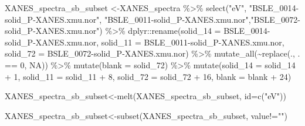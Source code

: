 \documentclass[
]{article}
\newenvironment{Shaded}{\begin{snugshade}}{\end{snugshade}}
\newcommand{\AttributeTok}[1]{\textcolor[rgb]{0.77,0.63,0.00}{#1}}
\newcommand{\ConstantTok}[1]{\textcolor[rgb]{0.00,0.00,0.00}{#1}}
\newcommand{\DecValTok}[1]{\textcolor[rgb]{0.00,0.00,0.81}{#1}}
\newcommand{\FunctionTok}[1]{\textcolor[rgb]{0.00,0.00,0.00}{#1}}
\newcommand{\NormalTok}[1]{#1}
\newcommand{\OtherTok}[1]{\textcolor[rgb]{0.56,0.35,0.01}{#1}}
\newcommand{\SpecialCharTok}[1]{\textcolor[rgb]{0.00,0.00,0.00}{#1}}
\newcommand{\StringTok}[1]{\textcolor[rgb]{0.31,0.60,0.02}{#1}}
\begin{document}
\begin{Shaded}
\begin{Highlighting}[]
\NormalTok{XANES\_spectra\_sb\_subset }\OtherTok{\textless{}{-}}\NormalTok{XANES\_spectra }\SpecialCharTok{\%\textgreater{}\%}
  \FunctionTok{select}\NormalTok{(}\StringTok{"eV"}\NormalTok{, }\StringTok{"BSLE\_0014{-}solid\_P{-}XANES.xmu.nor"}\NormalTok{, }\StringTok{"BSLE\_0011{-}solid\_P{-}XANES.xmu.nor"}\NormalTok{,}\StringTok{"BSLE\_0072{-}solid\_P{-}XANES.xmu.nor"}\NormalTok{) }\SpecialCharTok{\%\textgreater{}\%}
\NormalTok{  dplyr}\SpecialCharTok{::}\FunctionTok{rename}\NormalTok{(}\StringTok{\textquotesingle{}solid\_14\textquotesingle{}} \OtherTok{=} \StringTok{\textquotesingle{}BSLE\_0014{-}solid\_P{-}XANES.xmu.nor\textquotesingle{}}\NormalTok{,}
                \StringTok{\textquotesingle{}solid\_11\textquotesingle{}} \OtherTok{=} \StringTok{\textquotesingle{}BSLE\_0011{-}solid\_P{-}XANES.xmu.nor\textquotesingle{}}\NormalTok{,}
                \StringTok{\textquotesingle{}solid\_72\textquotesingle{}} \OtherTok{=} \StringTok{\textquotesingle{}BSLE\_0072{-}solid\_P{-}XANES.xmu.nor\textquotesingle{}}\NormalTok{) }\SpecialCharTok{\%\textgreater{}\%}
  \FunctionTok{mutate\_all}\NormalTok{(}\SpecialCharTok{\textasciitilde{}}\FunctionTok{replace}\NormalTok{(., . }\SpecialCharTok{==} \DecValTok{0}\NormalTok{, }\ConstantTok{NA}\NormalTok{)) }\SpecialCharTok{\%\textgreater{}\%}
  \FunctionTok{mutate}\NormalTok{(}\AttributeTok{blank =}\NormalTok{ solid\_72) }\SpecialCharTok{\%\textgreater{}\%}
  \FunctionTok{mutate}\NormalTok{(}\AttributeTok{solid\_14 =}\NormalTok{ solid\_14 }\SpecialCharTok{+} \DecValTok{1}\NormalTok{,}
         \AttributeTok{solid\_11 =}\NormalTok{ solid\_11 }\SpecialCharTok{+} \DecValTok{8}\NormalTok{,}
         \AttributeTok{solid\_72 =}\NormalTok{ solid\_72 }\SpecialCharTok{+} \DecValTok{16}\NormalTok{,}
         \AttributeTok{blank =}\NormalTok{ blank }\SpecialCharTok{+} \DecValTok{24}\NormalTok{) }
         
\NormalTok{XANES\_spectra\_sb\_subset}\OtherTok{\textless{}{-}}\FunctionTok{melt}\NormalTok{(XANES\_spectra\_sb\_subset, }\AttributeTok{id=}\FunctionTok{c}\NormalTok{(}\StringTok{"eV"}\NormalTok{))}

\NormalTok{XANES\_spectra\_sb\_subset}\OtherTok{\textless{}{-}}\FunctionTok{subset}\NormalTok{(XANES\_spectra\_sb\_subset, value}\SpecialCharTok{!=}\StringTok{""}\NormalTok{)}


\end{Highlighting}
\end{Shaded}
\end{document}
